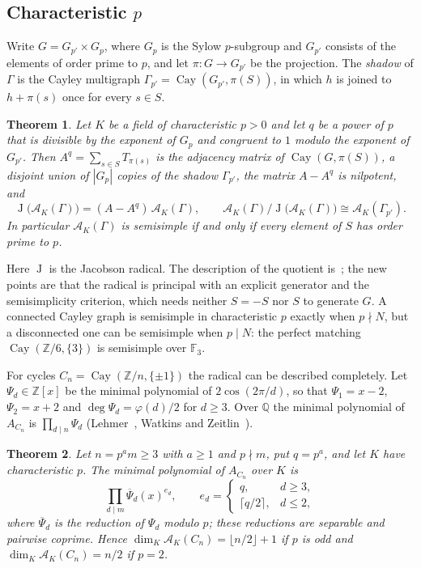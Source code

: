 \documentclass[11pt]{amsart}
\newtheorem{thmx}{Theorem}
\theoremstyle{definition}
\theoremstyle{remark}
\numberwithin{equation}{section}
\newcommand{\Q}{\mathbb{Q}}
\newcommand{\Z}{\mathbb{Z}}
\newcommand{\F}{\mathbb{F}}
\newcommand{\cA}{\mathcal{A}}
\newcommand{\Cay}{\operatorname{Cay}}
\newcommand{\rad}{\operatorname{J}}
\begin{document}
\subsection*{Characteristic \texorpdfstring{$p$}{p}} Write $G=G_{p'}\times G_p$, where $G_p$ is the Sylow $p$-subgroup and $G_{p'}$ consists of the elements of order prime to $p$, and let $\pi\colon G\to G_{p'}$ be the projection. The \emph{shadow} of $\Gamma$ is the Cayley multigraph $\Gamma_{p'}=\Cay(G_{p'},\pi(S))$, in which $h$ is joined to $h+\pi(s)$ once for every $s\in S$.

\begin{thmx}\label{thm:A}
Let $K$ be a field of characteristic $p>0$ and let $q$ be a power of $p$ that is divisible by the exponent of $G_p$ and congruent to $1$ modulo the exponent of $G_{p'}$. Then $A^q=\sum_{s\in S}T_{\pi(s)}$ is the adjacency matrix of $\Cay(G,\pi(S))$, a disjoint union of $|G_p|$ copies of the shadow $\Gamma_{p'}$, the matrix $A-A^q$ is nilpotent, and
\[
\rad\bigl(\cA_K(\Gamma)\bigr)=(A-A^q)\,\cA_K(\Gamma),\qquad \cA_K(\Gamma)/\rad\bigl(\cA_K(\Gamma)\bigr)\cong \cA_K(\Gamma_{p'}).
\]
In particular $\cA_K(\Gamma)$ is semisimple if and only if every element of $S$ has order prime to $p$.
\end{thmx}

Here $\rad$ is the Jacobson radical. The description of the quotient is~\cite[Proposition~14.4]{BMB}; the new points are that the radical is principal with an explicit generator and the semisimplicity criterion, which needs neither $S=-S$ nor $S$ to generate $G$. A connected Cayley graph is semisimple in characteristic $p$ exactly when $p\nmid N$, but a disconnected one can be semisimple when $p\mid N$: the perfect matching $\Cay(\Z/6,\{3\})$ is semisimple over $\F_3$.

For cycles $C_n=\Cay(\Z/n,\{\pm1\})$ the radical can be described completely. Let $\Psi_d\in\Z[x]$ be the minimal polynomial of $2\cos(2\pi/d)$, so that $\Psi_1=x-2$, $\Psi_2=x+2$ and $\deg\Psi_d=\varphi(d)/2$ for $d\ge3$. Over $\Q$ the minimal polynomial of $A_{C_n}$ is $\prod_{d\mid n}\Psi_d$ (Lehmer~\cite{Le}, Watkins and Zeitlin~\cite{WZ}).

\begin{thmx}\label{thm:B}
Let $n=p^a m\ge3$ with $a\ge1$ and $p\nmid m$, put $q=p^a$, and let $K$ have characteristic $p$. The minimal polynomial of $A_{C_n}$ over $K$ is
\[
\prod_{d\mid m}\overline{\Psi}_d(x)^{e_d},\qquad e_d=\begin{cases} q, & d\ge3,\\ \lceil q/2\rceil, & d\le2,\end{cases}
\]
where $\overline{\Psi}_d$ is the reduction of $\Psi_d$ modulo $p$; these reductions are separable and pairwise coprime. Hence $\dim_K\cA_K(C_n)=\lfloor n/2\rfloor+1$ if $p$ is odd and $\dim_K\cA_K(C_n)=n/2$ if $p=2$.
\end{thmx}
\end{document}
